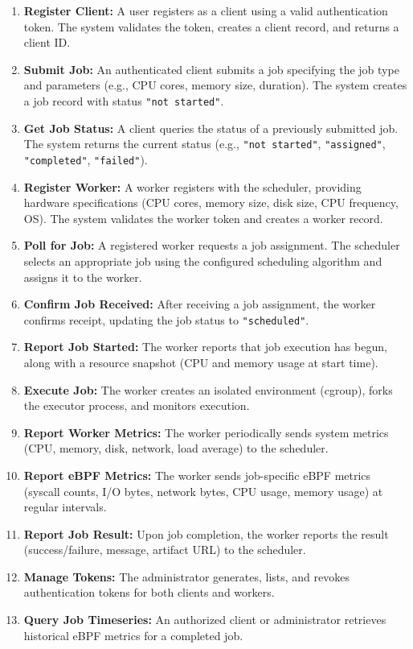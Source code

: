 \begin{enumerate}
	\item \textbf{Register Client:} A user registers as a client using a valid authentication token. The system validates the token, creates a client record, and returns a client ID.

	\item \textbf{Submit Job:} An authenticated client submits a job specifying the job type and parameters (e.g., CPU cores, memory size, duration). The system creates a job record with status \texttt{"not started"}.

	\item \textbf{Get Job Status:} A client queries the status of a previously submitted job. The system returns the current status (e.g., \texttt{"not started"}, \texttt{"assigned"}, \texttt{"completed"}, \texttt{"failed"}).

	\item \textbf{Register Worker:} A worker registers with the scheduler, providing hardware specifications (CPU cores, memory size, disk size, CPU frequency, OS). The system validates the worker token and creates a worker record.

	\item \textbf{Poll for Job:} A registered worker requests a job assignment. The scheduler selects an appropriate job using the configured scheduling algorithm and assigns it to the worker.

	\item \textbf{Confirm Job Received:} After receiving a job assignment, the worker confirms receipt, updating the job status to \texttt{"scheduled"}.

	\item \textbf{Report Job Started:} The worker reports that job execution has begun, along with a resource snapshot (CPU and memory usage at start time).

	\item \textbf{Execute Job:} The worker creates an isolated environment (cgroup), forks the executor process, and monitors execution.

	\item \textbf{Report Worker Metrics:} The worker periodically sends system metrics (CPU, memory, disk, network, load average) to the scheduler.

	\item \textbf{Report eBPF Metrics:} The worker sends job-specific eBPF metrics (syscall counts, I/O bytes, network bytes, CPU usage, memory usage) at regular intervals.

	\item \textbf{Report Job Result:} Upon job completion, the worker reports the result (success/failure, message, artifact URL) to the scheduler.

	\item \textbf{Manage Tokens:} The administrator generates, lists, and revokes authentication tokens for both clients and workers.

	\item \textbf{Query Job Timeseries:} An authorized client or administrator retrieves historical eBPF metrics for a completed job.
\end{enumerate}

